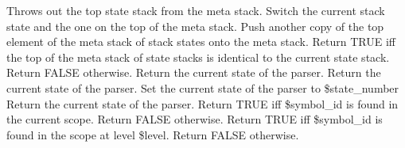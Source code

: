 Throws out the top state stack from the meta stack.
Switch the current stack state and the one on the top of the meta stack.
Push another copy of the top element of the meta stack of stack states onto
the meta stack.
Return TRUE iff the top of the meta stack of state stacks is
identical to the current state stack. Return FALSE otherwise.
Return the current state of the parser.
Return the current state of the parser.
Set the current state of the parser to \$state\_\-number
Return the current state of the parser.
Return TRUE iff \$symbol\_\-id is found in the current scope.
Return FALSE otherwise.
Return TRUE iff \$symbol\_\-id is found in the scope at level \$level.
Return FALSE otherwise.
